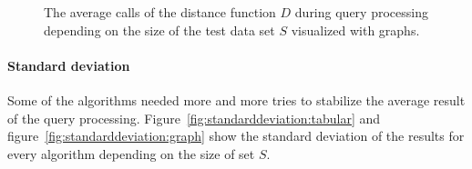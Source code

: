 \documentclass[runningheads,a4paper]{llncs}
\begin{document}
\begin{figure}
	\begin{center}
	\end{center}
	\caption{The average calls of the distance function $D$ during query processing depending on the size of the test
		data set $S$ visualized with graphs.}
	\label{fig:queryprocessing:graph}
\end{figure}

\paragraph{Standard deviation}

Some of the algorithms needed more and more tries to stabilize the average result of the query processing.
Figure~\ref{fig:standarddeviation:tabular} and figure~\ref{fig:standarddeviation:graph} show the standard deviation of
the results for every algorithm depending on the size of set $S$.
\end{document}
